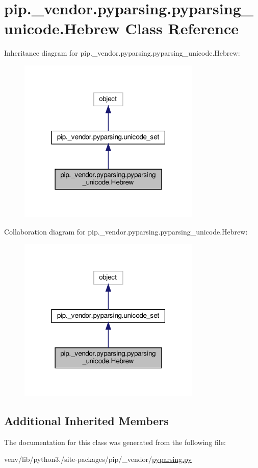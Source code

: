 \hypertarget{classpip_1_1__vendor_1_1pyparsing_1_1pyparsing__unicode_1_1Hebrew}{}\section{pip.\+\_\+vendor.\+pyparsing.\+pyparsing\+\_\+unicode.\+Hebrew Class Reference}
\label{classpip_1_1__vendor_1_1pyparsing_1_1pyparsing__unicode_1_1Hebrew}


Inheritance diagram for pip.\+\_\+vendor.\+pyparsing.\+pyparsing\+\_\+unicode.\+Hebrew\+:
\nopagebreak
\begin{figure}[H]
\begin{center}
\leavevmode
\includegraphics[width=247pt]{classpip_1_1__vendor_1_1pyparsing_1_1pyparsing__unicode_1_1Hebrew__inherit__graph}
\end{center}
\end{figure}


Collaboration diagram for pip.\+\_\+vendor.\+pyparsing.\+pyparsing\+\_\+unicode.\+Hebrew\+:
\nopagebreak
\begin{figure}[H]
\begin{center}
\leavevmode
\includegraphics[width=247pt]{classpip_1_1__vendor_1_1pyparsing_1_1pyparsing__unicode_1_1Hebrew__coll__graph}
\end{center}
\end{figure}
\subsection*{Additional Inherited Members}


The documentation for this class was generated from the following file\+:\begin{DoxyCompactItemize}
\item 
venv/lib/python3./site-\/packages/pip/\+\_\+vendor/\hyperlink{pip_2__vendor_2pyparsing_8py}{pyparsing.\+py}\end{DoxyCompactItemize}
